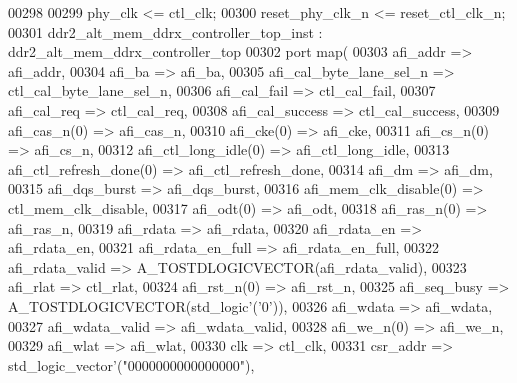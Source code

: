 \begin{DoxyCode}
00298 
00299   \textcolor{vhdlchar}{phy_clk} \textcolor{vhdlchar}{<=} \textcolor{vhdlchar}{ctl_clk};
00300   \textcolor{vhdlchar}{reset_phy_clk_n} \textcolor{vhdlchar}{<=} \textcolor{vhdlchar}{reset_ctl_clk_n};
00301   ddr2\_alt\_mem\_ddrx\_controller\_top\_inst : ddr2\_alt\_mem\_ddrx\_controller\_top
00302     \textcolor{keywordflow}{port} \textcolor{keywordflow}{map}(
00303             afi\_addr => afi_addr,
00304             afi\_ba => afi_ba,
00305             afi\_cal\_byte\_lane\_sel\_n => ctl_cal_byte_lane_sel_n,
00306             afi\_cal\_fail => ctl_cal_fail,
00307             afi\_cal\_req => ctl_cal_req,
00308             afi\_cal\_success => ctl_cal_success,
00309             afi_cas_n\textcolor{vhdlchar}{(}\textcolor{vhdllogic}{0}\textcolor{vhdlchar}{)} => afi_cas_n,
00310             afi_cke\textcolor{vhdlchar}{(}\textcolor{vhdllogic}{0}\textcolor{vhdlchar}{)} => afi_cke,
00311             afi_cs_n\textcolor{vhdlchar}{(}\textcolor{vhdllogic}{0}\textcolor{vhdlchar}{)} => afi_cs_n,
00312             afi_ctl_long_idle\textcolor{vhdlchar}{(}\textcolor{vhdllogic}{0}\textcolor{vhdlchar}{)} => afi_ctl_long_idle,
00313             afi_ctl_refresh_done\textcolor{vhdlchar}{(}\textcolor{vhdllogic}{0}\textcolor{vhdlchar}{)} => afi_ctl_refresh_done,
00314             afi\_dm => afi_dm,
00315             afi\_dqs\_burst => afi_dqs_burst,
00316             afi\_mem\_clk\_disable\textcolor{vhdlchar}{(}\textcolor{vhdllogic}{0}\textcolor{vhdlchar}{)} => ctl_mem_clk_disable,
00317             afi_odt\textcolor{vhdlchar}{(}\textcolor{vhdllogic}{0}\textcolor{vhdlchar}{)} => afi_odt,
00318             afi_ras_n\textcolor{vhdlchar}{(}\textcolor{vhdllogic}{0}\textcolor{vhdlchar}{)} => afi_ras_n,
00319             afi\_rdata => afi_rdata,
00320             afi\_rdata\_en => afi_rdata_en,
00321             afi\_rdata\_en\_full => afi_rdata_en_full,
00322             afi\_rdata\_valid => A\_TOSTDLOGICVECTOR\textcolor{vhdlchar}{(}afi_rdata_valid\textcolor{vhdlchar}{)},
00323             afi\_rlat => ctl_rlat,
00324             afi_rst_n\textcolor{vhdlchar}{(}\textcolor{vhdllogic}{0}\textcolor{vhdlchar}{)} => afi_rst_n,
00325             afi\_seq\_busy => A\_TOSTDLOGICVECTOR\textcolor{vhdlchar}{(}std\_logic'\textcolor{vhdlchar}{(}'0'\textcolor{vhdlchar}{)}\textcolor{vhdlchar}{)},
00326             afi\_wdata => afi_wdata,
00327             afi\_wdata\_valid => afi_wdata_valid,
00328             afi_we_n\textcolor{vhdlchar}{(}\textcolor{vhdllogic}{0}\textcolor{vhdlchar}{)} => afi_we_n,
00329             afi\_wlat => afi_wlat,
00330             clk => ctl_clk,
00331             csr\_addr => std\_logic\_vector'\textcolor{vhdlchar}{(}"0000000000000000"\textcolor{vhdlchar}{)},

\end{DoxyCode}
